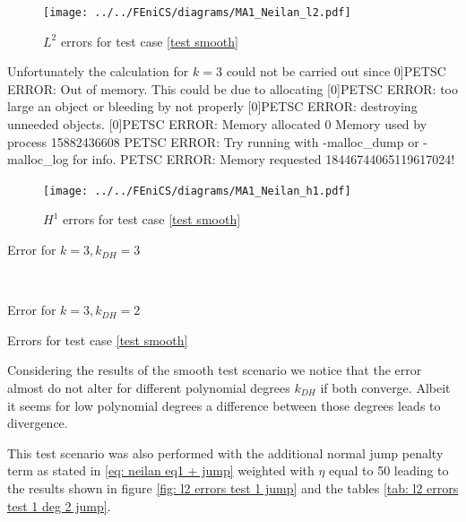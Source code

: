 \begin{figure}[h!]
\centering
	\texttt{[image: ../../FEniCS/diagrams/MA1\_Neilan\_l2.pdf]}
	\caption{$L^2$ errors for test case \ref{test smooth}}
	\label{fig: l2 errors test 1}
\end{figure}
 Unfortunately the calculation for $k=3$ could not be carried out since 
 0]PETSC ERROR: Out of memory. This could be due to allocating
 [0]PETSC ERROR: too large an object or bleeding by not properly
 [0]PETSC ERROR: destroying unneeded objects.
 [0]PETSC ERROR: Memory allocated 0 Memory used by process 15882436608
 PETSC ERROR: Try running with -malloc\_dump or -malloc\_log for info.
 PETSC ERROR: Memory requested 18446744065119617024!
 
\begin{figure}[h!]
\centering
	\texttt{[image: ../../FEniCS/diagrams/MA1\_Neilan\_h1.pdf]}
	\caption{$H^1$ errors for test case \ref{test smooth}}
	\label{fig: h2 errors test 1}
\end{figure}

\begin{table}[h]
	\begin{subtable}[b]{0.45\textwidth}
		\centering
		\pgfplotstabletypeset[columns={iterations, l2error, h1error,N},
				    every row 0 column 0/.style={set content=init},
		]\MAOnedegThreeThree
    	\caption{Error for $k=3, k_{DH}=3$}
   \end{subtable}
   ~
	\begin{subtable}[b]{0.45\textwidth}
		\centering
		\pgfplotstabletypeset[columns={iterations, l2error, h1error,N},
				    every row 0 column 0/.style={set content=init},
		]\MAOnedegThreeTwo
 	\caption{Error for $k=3, k_{DH}=2$}
	\end{subtable}
	\caption{Errors for test case \ref{test smooth}}
	\label{tab: l2 errors test 1 deg 2}
\end{table}


Considering the results of the smooth test scenario we notice that the error almost do not alter for different polynomial degrees $k_{DH}$ if both converge. Albeit it seems for low polynomial degrees a difference between those degrees leads to divergence.

This test scenario was also performed with the additional normal jump penalty term as stated in \eqref{eq: neilan eq1 + jump} weighted with $\eta$ equal to 50 leading to the results shown in figure \ref{fig: l2 errors test 1 jump} and the tables \ref{tab: l2 errors test 1 deg 2 jump}.

